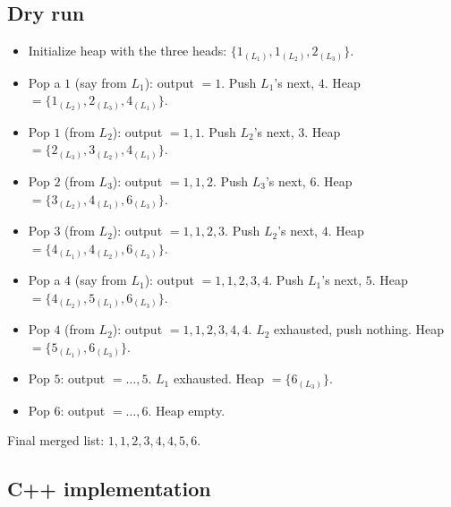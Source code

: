 \subsection*{Dry run}


\begin{itemize}
  \item Initialize heap with the three heads: $\{1_{(L_1)}, 1_{(L_2)},
        2_{(L_3)}\}$.
  \item Pop a $1$ (say from $L_1$): output $=1$. Push $L_1$'s next, $4$.
        Heap $=\{1_{(L_2)}, 2_{(L_3)}, 4_{(L_1)}\}$.
  \item Pop $1$ (from $L_2$): output $=1,1$. Push $L_2$'s next, $3$.
        Heap $=\{2_{(L_3)}, 3_{(L_2)}, 4_{(L_1)}\}$.
  \item Pop $2$ (from $L_3$): output $=1,1,2$. Push $L_3$'s next, $6$.
        Heap $=\{3_{(L_2)}, 4_{(L_1)}, 6_{(L_3)}\}$.
  \item Pop $3$ (from $L_2$): output $=1,1,2,3$. Push $L_2$'s next, $4$.
        Heap $=\{4_{(L_1)}, 4_{(L_2)}, 6_{(L_3)}\}$.
  \item Pop a $4$ (say from $L_1$): output $=1,1,2,3,4$. Push $L_1$'s
        next, $5$. Heap $=\{4_{(L_2)}, 5_{(L_1)}, 6_{(L_3)}\}$.
  \item Pop $4$ (from $L_2$): output $=1,1,2,3,4,4$. $L_2$ exhausted, push
        nothing. Heap $=\{5_{(L_1)}, 6_{(L_3)}\}$.
  \item Pop $5$: output $=\dots,5$. $L_1$ exhausted. Heap $=\{6_{(L_3)}\}$.
  \item Pop $6$: output $=\dots,6$. Heap empty.
\end{itemize}

Final merged list: $1,1,2,3,4,4,5,6$.

\subsection*{C++ implementation}


